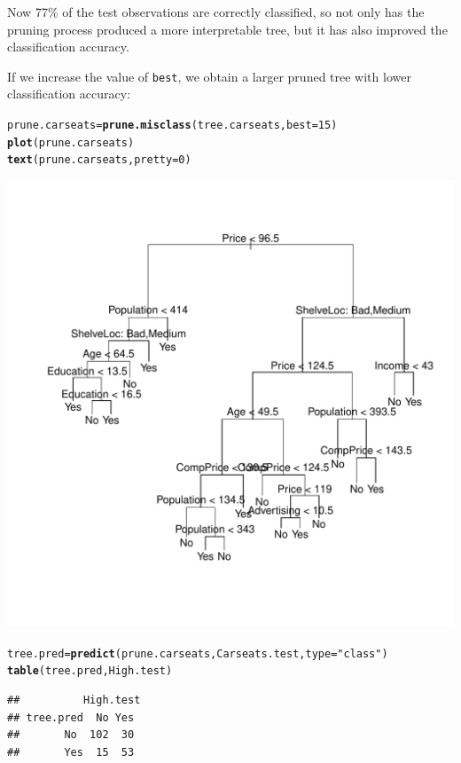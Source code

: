 \documentclass[12pt]{article}\usepackage[]{graphicx}\usepackage[]{color}
\makeatletter
\def\maxwidth{ %
  \ifdim\Gin@nat@width>\linewidth
    \linewidth
  \else
    \Gin@nat@width
  \fi
}
\newcommand{\hlnum}[1]{\textcolor[rgb]{0.686,0.059,0.569}{#1}}%
\newcommand{\hlstr}[1]{\textcolor[rgb]{0.192,0.494,0.8}{#1}}%
\newcommand{\hlstd}[1]{\textcolor[rgb]{0.345,0.345,0.345}{#1}}%
\newcommand{\hlkwb}[1]{\textcolor[rgb]{0.69,0.353,0.396}{#1}}%
\newcommand{\hlkwc}[1]{\textcolor[rgb]{0.333,0.667,0.333}{#1}}%
\newcommand{\hlkwd}[1]{\textcolor[rgb]{0.737,0.353,0.396}{\textbf{#1}}}%
\newenvironment{kframe}{%
 \def\at@end@of@kframe{}%
 \ifinner\ifhmode%
  \def\at@end@of@kframe{\end{minipage}}%
  \begin{minipage}{\columnwidth}%
 \fi\fi%
 \def\FrameCommand##1{\hskip\@totalleftmargin \hskip-\fboxsep
 \colorbox{shadecolor}{##1}\hskip-\fboxsep
     \hskip-\linewidth \hskip-\@totalleftmargin \hskip\columnwidth}%
 \MakeFramed {\advance\hsize-\width
   \@totalleftmargin\z@ \linewidth\hsize
   \@setminipage}}%
 {\par\unskip\endMakeFramed%
 \at@end@of@kframe}
\newenvironment{knitrout}{}{} %
\makeatother
\begin{document}
Now 77\% of the test observations are correctly classified, so not only has the pruning process produced a more interpretable tree, but it has also improved the classification accuracy.

If we increase the value of \texttt{best}, we obtain a larger pruned tree with lower classification accuracy:
\begin{knitrout}
\color{fgcolor}\begin{kframe}
\begin{alltt}
\hlstd{prune.carseats} \hlkwb{=} \hlkwd{prune.misclass}\hlstd{(tree.carseats,} \hlkwc{best} \hlstd{=} \hlnum{15}\hlstd{)}
\hlkwd{plot}\hlstd{(prune.carseats)}
\hlkwd{text}\hlstd{(prune.carseats,} \hlkwc{pretty}\hlstd{=}\hlnum{0}\hlstd{)}
\end{alltt}
\end{kframe}
\includegraphics[width=\maxwidth]{figure/unnamed-chunk-13-1} 
\begin{kframe}\begin{alltt}
\hlstd{tree.pred}\hlkwb{=}\hlkwd{predict}\hlstd{(prune.carseats, Carseats.test,} \hlkwc{type}\hlstd{=}\hlstr{"class"}\hlstd{)}
\hlkwd{table}\hlstd{(tree.pred, High.test)}
\end{alltt}
\begin{verbatim}
##          High.test
## tree.pred  No Yes
##       No  102  30
##       Yes  15  53
\end{verbatim}
\end{kframe}
\end{knitrout}
\end{document}

